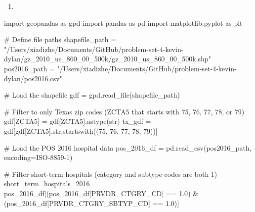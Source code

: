 \documentclass[
  letterpaper,
  DIV=11,
  numbers=noendperiod]{scrartcl}
\newenvironment{Shaded}{\begin{snugshade}}{\end{snugshade}}
\newcommand{\BuiltInTok}[1]{\textcolor[rgb]{0.00,0.23,0.31}{#1}}
\newcommand{\CommentTok}[1]{\textcolor[rgb]{0.37,0.37,0.37}{#1}}
\newcommand{\FloatTok}[1]{\textcolor[rgb]{0.68,0.00,0.00}{#1}}
\newcommand{\ImportTok}[1]{\textcolor[rgb]{0.00,0.46,0.62}{#1}}
\newcommand{\NormalTok}[1]{\textcolor[rgb]{0.00,0.23,0.31}{#1}}
\newcommand{\OperatorTok}[1]{\textcolor[rgb]{0.37,0.37,0.37}{#1}}
\newcommand{\StringTok}[1]{\textcolor[rgb]{0.13,0.47,0.30}{#1}}
\providecommand{\tightlist}{%
  \setlength{\itemsep}{0pt}\setlength{\parskip}{0pt}}\usepackage{longtable,booktabs,array}
\begin{document}
\begin{enumerate}
\def\labelenumi{\arabic{enumi}.}
\setcounter{enumi}{1}
\tightlist
\item
\end{enumerate}

\begin{Shaded}
\begin{Highlighting}[]
\ImportTok{import}\NormalTok{ geopandas }\ImportTok{as}\NormalTok{ gpd}
\ImportTok{import}\NormalTok{ pandas }\ImportTok{as}\NormalTok{ pd}
\ImportTok{import}\NormalTok{ matplotlib.pyplot }\ImportTok{as}\NormalTok{ plt}

\CommentTok{\# Define file paths}
\NormalTok{shapefile\_path }\OperatorTok{=} \StringTok{"/Users/xiadizhe/Documents/GitHub/problem{-}set{-}4{-}kevin{-}dylan/gz\_2010\_us\_860\_00\_500k/gz\_2010\_us\_860\_00\_500k.shp"}
\NormalTok{pos2016\_path }\OperatorTok{=} \StringTok{"/Users/xiadizhe/Documents/GitHub/problem{-}set{-}4{-}kevin{-}dylan/pos2016.csv"}

\CommentTok{\# Load the shapefile}
\NormalTok{gdf }\OperatorTok{=}\NormalTok{ gpd.read\_file(shapefile\_path)}

\CommentTok{\# Filter to only Texas zip codes (ZCTA5 that starts with 75, 76, 77, 78, or 79)}
\NormalTok{gdf[}\StringTok{\textquotesingle{}ZCTA5\textquotesingle{}}\NormalTok{] }\OperatorTok{=}\NormalTok{ gdf[}\StringTok{\textquotesingle{}ZCTA5\textquotesingle{}}\NormalTok{].astype(}\BuiltInTok{str}\NormalTok{)}
\NormalTok{tx\_gdf }\OperatorTok{=}\NormalTok{ gdf[gdf[}\StringTok{\textquotesingle{}ZCTA5\textquotesingle{}}\NormalTok{].}\BuiltInTok{str}\NormalTok{.startswith((}\StringTok{\textquotesingle{}75\textquotesingle{}}\NormalTok{, }\StringTok{\textquotesingle{}76\textquotesingle{}}\NormalTok{, }\StringTok{\textquotesingle{}77\textquotesingle{}}\NormalTok{, }\StringTok{\textquotesingle{}78\textquotesingle{}}\NormalTok{, }\StringTok{\textquotesingle{}79\textquotesingle{}}\NormalTok{))]}

\CommentTok{\# Load the POS 2016 hospital data}
\NormalTok{pos\_2016\_df }\OperatorTok{=}\NormalTok{ pd.read\_csv(pos2016\_path, encoding}\OperatorTok{=}\StringTok{\textquotesingle{}ISO{-}8859{-}1\textquotesingle{}}\NormalTok{)}

\CommentTok{\# Filter short{-}term hospitals (category and subtype codes are both 1)}
\NormalTok{short\_term\_hospitals\_2016 }\OperatorTok{=}\NormalTok{ pos\_2016\_df[(pos\_2016\_df[}\StringTok{\textquotesingle{}PRVDR\_CTGRY\_CD\textquotesingle{}}\NormalTok{] }\OperatorTok{==} \FloatTok{1.0}\NormalTok{) }\OperatorTok{\&}\NormalTok{ (pos\_2016\_df[}\StringTok{\textquotesingle{}PRVDR\_CTGRY\_SBTYP\_CD\textquotesingle{}}\NormalTok{] }\OperatorTok{==} \FloatTok{1.0}\NormalTok{)]}


\end{Highlighting}
\end{Shaded}
\end{document}
